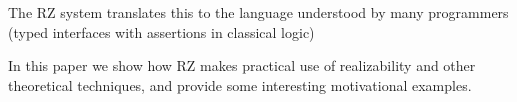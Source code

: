 
The RZ system translates this to the language understood by many
programmers (typed interfaces with assertions in classical logic)

\bigskip

In this paper we show how RZ makes practical use of realizability and
other theoretical techniques, and provide some interesting motivational
examples.


